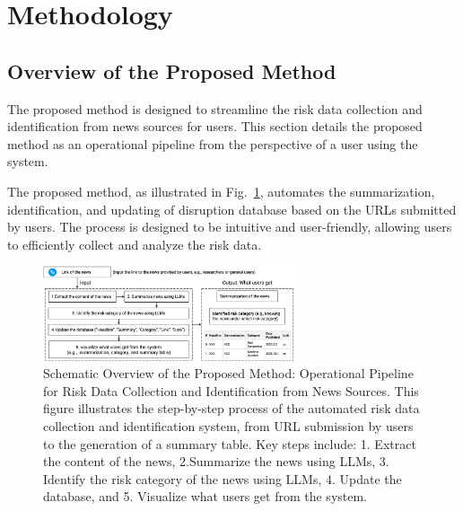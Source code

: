 \section{Methodology}

\subsection{Overview of the Proposed Method}

The proposed method is designed to streamline the risk data collection and identification from news sources for users. This section details the proposed method as an operational pipeline from the perspective of a user using the system.

The proposed method, as illustrated in Fig.~\ref{fig:pipeline}, automates the summarization, identification, and updating of disruption database based on the URLs submitted by users. The process is designed to be intuitive and user-friendly, allowing users to efficiently collect and analyze the risk data.

\begin{figure}[ht!]
\centering
\includegraphics[width=0.66\textwidth]{figures/pipeline.png}
\caption{Schematic Overview of the Proposed Method: Operational Pipeline for Risk Data Collection and Identification from News Sources. This figure illustrates the step-by-step process of the automated risk data collection and identification system, from URL submission by users to the generation of a summary table. Key steps include: 1. Extract the content of the news, 2.Summarize the news using LLMs, 3. Identify the risk category of the news using LLMs, 4. Update the database, and 5. Visualize what users get from the system. 
}
\label{fig:pipeline}
\end{figure}


